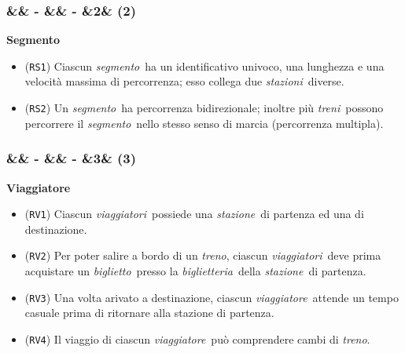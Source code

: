 \documentclass[slidestop,compress,blackandwhite]{beamer}
\newcommand{\ttt}[1]{\texttt{#1}}
\newcommand{\ii}[1]{\textit{#1}}
\newcommand{\treno}{\ii{treno}}
\newcommand{\treni}{\ii{treni}}
\newcommand{\viaggiatore}{\ii{viaggiatore}}
\newcommand{\viaggiatori}{\ii{viaggiatori}}
\newcommand{\stazione}{\ii{stazione}}
\newcommand{\stazioni}{\ii{stazioni}}
\newcommand{\ticket}{\ii{biglietto}}
\newcommand{\segmento}{\ii{segmento}}
\newcommand{\biglietteria}{\ii{biglietteria}}
\newcommand{\newtitle}[4]{
	#1 
	\ifx&#2&%
	\else
  		\large- #2
	\fi
	\ifx&#3&%
	\else
  		\normalsize- #3
	\fi
	\ifx&#4&%
	\else
  		\normalsize (#4)
	\fi
}
\newcommand{\newframe}[5]{
	\begin{frame}
		\frametitle{\newtitle{#1}{#2}{#3}{#4}}
		#5
	\end{frame}
}
\newcommand{\itemt}[1]{\item (\ttt{#1})}
\begin{document}
	
	\newframe{}{}{}{2}{
	
		\vspace{0.5cm}
		\textbf{Segmento}
		\begin{itemize}
			\itemt{RS1} Ciascun \segmento~ha un identificativo univoco, una lunghezza e una velocità massima di percorrenza; esso collega due \stazioni~diverse.
			\itemt{RS2} Un \segmento~ha percorrenza bidirezionale; inoltre più \treni~possono percorrere il \segmento~nello stesso senso di marcia (percorrenza multipla).  
		\end{itemize}
	
	}

	\newframe{}{}{}{3}{
		
		\vspace{0.5cm}
		\textbf{Viaggiatore}
		\begin{itemize}
			\itemt{RV1} Ciascun \viaggiatori~possiede una \stazione~di partenza ed una di destinazione.
			\itemt{RV2} Per poter salire a bordo di un \treno, ciascun \viaggiatori~deve prima acquistare un \ticket~presso la \biglietteria~della \stazione~di partenza.
			\itemt{RV3} Una volta arivato a destinazione, ciascun \viaggiatore~attende un tempo casuale prima di ritornare alla stazione di partenza.
			\itemt{RV4} Il viaggio di ciascun \viaggiatore~può comprendere cambi di \treno.
		\end{itemize}
		
	}
\end{document}
